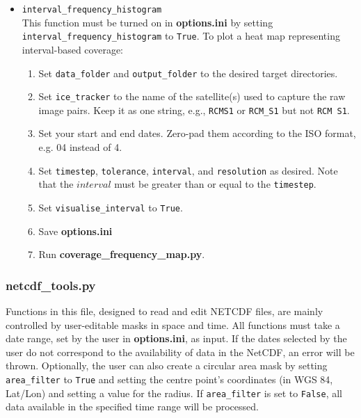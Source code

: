\documentclass{article}
\begin{document}
\begin{itemize}
            \item{} \verb?interval_frequency_histogram? \\
            This function must be turned on in \textbf{options.ini} by setting \verb?interval_frequency_histogram? to \verb?True?. To plot a heat map representing interval-based coverage:
            \begin{enumerate}
                \item Set \verb?data_folder? and \verb?output_folder? to the desired target directories.
                \item Set \verb?ice_tracker? to the name of the satellite(s) used to capture the raw image pairs. Keep it as one string, e.g., \verb?RCMS1? or \verb?RCM_S1? but not \verb?RCM S1?.
                \item Set your start and end dates. Zero-pad them according to the ISO format, e.g. 04 instead of 4.
                \item Set \verb?timestep?, \verb?tolerance?, \verb?interval?, and \verb?resolution? as desired. Note that the $interval$ must be greater than or equal to the \verb?timestep?.
                \item Set \verb?visualise_interval? to \verb?True?.
                \item Save \textbf{options.ini}
                \item Run \textbf{coverage\_frequency\_map.py}.
            \end{enumerate}
        \end{itemize}

        \subsubsection{\textbf{netcdf\_tools.py}}

            Functions in this file, designed to read and edit NETCDF files, are mainly controlled by user-editable masks in space and time. All functions must take a date range, set by the user in \textbf{options.ini}, as input. If the dates selected by the user do not correspond to the availability of data in the NetCDF, an error will be thrown. Optionally, the user can also create a circular area mask by setting \verb?area_filter? to \verb?True? and setting the centre point's coordinates (in WGS 84, Lat/Lon) and setting a value for the radius. If \verb?area_filter? is set to \verb?False?, all data available in the specified time range will be processed.
\end{document}
